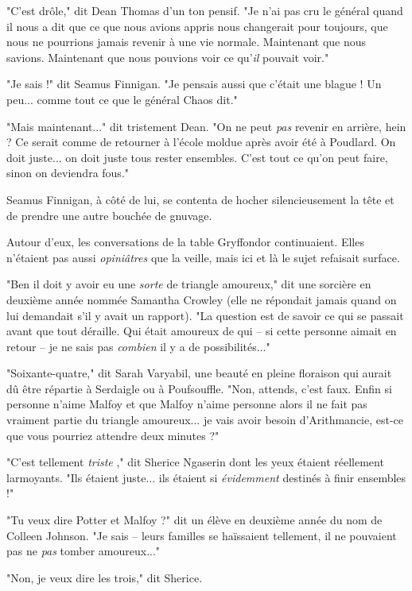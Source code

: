 "C'est drôle," dit Dean Thomas d'un ton pensif. "Je n'ai pas cru le général quand il nous a dit que ce que nous avions appris nous changerait pour toujours, que nous ne pourrions jamais revenir à une vie normale. Maintenant que nous savions. Maintenant que nous pouvions voir ce qu'\emph{il}  pouvait voir."

"Je sais !" dit Seamus Finnigan. "Je pensais aussi que c'était une blague ! Un peu... comme tout ce que le général Chaos dit."

"Mais maintenant..." dit tristement Dean. "On ne peut \emph{pas}  revenir en arrière, hein ? Ce serait comme de retourner à l'école moldue après avoir été à Poudlard. On doit juste... on doit juste tous rester ensembles. C'est tout ce qu'on peut faire, sinon on deviendra fous."

Seamus Finnigan, à côté de lui, se contenta de hocher silencieusement la tête et de prendre une autre bouchée de gnuvage.

Autour d'eux, les conversations de la table Gryffondor continuaient. Elles n'étaient pas aussi \emph{opiniâtres}  que la veille, mais ici et là le sujet refaisait surface.

"Ben il doit y avoir eu une \emph{sorte}  de triangle amoureux," dit une sorcière en deuxième année nommée Samantha Crowley (elle ne répondait jamais quand on lui demandait s'il y avait un rapport). "La question est de savoir ce qui se passait avant que tout déraille. Qui était amoureux de qui – si cette personne aimait en retour – je ne sais pas \emph{combien}  il y a de possibilités..."

"Soixante-quatre," dit Sarah Varyabil, une beauté en pleine floraison qui aurait dû être répartie à Serdaigle ou à Poufsouffle. "Non, attends, c'est faux. Enfin si personne n'aime Malfoy et que Malfoy n'aime personne alors il ne fait pas vraiment partie du triangle amoureux... je vais avoir besoin d'Arithmancie, est-ce que vous pourriez attendre deux minutes ?"

"C'est tellement \emph{triste} ," dit Sherice Ngaserin dont les yeux étaient réellement larmoyants. "Ils étaient juste... ils étaient si \emph{évidemment}  destinés à finir ensembles !"

"Tu veux dire Potter et Malfoy ?" dit un élève en deuxième année du nom de Colleen Johnson. "Je sais – leurs familles se haïssaient tellement, il ne pouvaient pas ne \emph{pas}  tomber amoureux..."

"Non, je veux dire les trois," dit Sherice.

